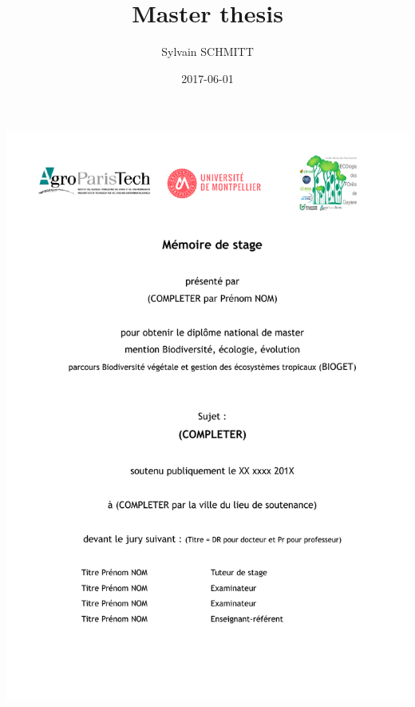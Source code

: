 \documentclass[]{article}
\title{Master thesis}
\author{Sylvain SCHMITT}
\date{2017-06-01}
\theoremstyle{definition}
\theoremstyle{definition}
\theoremstyle{remark}
\begin{document}
\maketitle

\thispagestyle{empty}
\begin{center}
\includegraphics{images/main.pdf}
\end{center}

\setlength{\abovedisplayskip}{-5pt}
\setlength{\abovedisplayshortskip}{-5pt}
\end{document}
